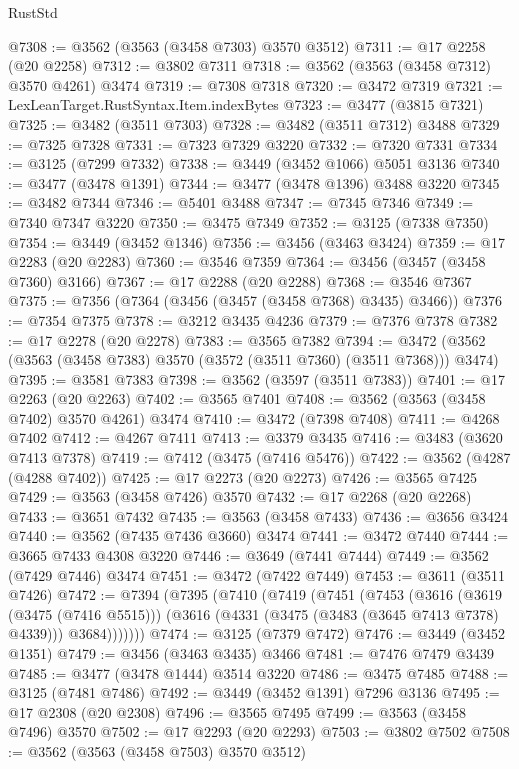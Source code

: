 \begin{lexlean}{RustStd}
\begin{coremodule}
{\begin{coremodule}
{{{{{{{{{{{{{{{{{{{{{{{{{{{{{{{{{{{{{{{{{{{{{@7308 := @3562 (@3563 (@3458 @7303) @3570 @3512)
@7311 := @17 @2258 (@20 @2258)
@7312 := @3802 @7311
@7318 := @3562 (@3563 (@3458 @7312) @3570 @4261) @3474
@7319 := @7308 @7318
@7320 := @3472 @7319
@7321 := LexLeanTarget.RustSyntax.Item.indexBytes
@7323 := @3477 (@3815 @7321)
@7325 := @3482 (@3511 @7303)
@7328 := @3482 (@3511 @7312) @3488
@7329 := @7325 @7328
@7331 := @7323 @7329 @3220
@7332 := @7320 @7331
@7334 := @3125 (@7299 @7332)
@7338 := @3449 (@3452 @1066) @5051 @3136
@7340 := @3477 (@3478 @1391)
@7344 := @3477 (@3478 @1396) @3488 @3220
@7345 := @3482 @7344
@7346 := @5401 @3488
@7347 := @7345 @7346
@7349 := @7340 @7347 @3220
@7350 := @3475 @7349
@7352 := @3125 (@7338 @7350)
@7354 := @3449 (@3452 @1346)
@7356 := @3456 (@3463 @3424)
@7359 := @17 @2283 (@20 @2283)
@7360 := @3546 @7359
@7364 := @3456 (@3457 (@3458 @7360) @3166)
@7367 := @17 @2288 (@20 @2288)
@7368 := @3546 @7367
@7375 := @7356 (@7364 (@3456 (@3457 (@3458 @7368) @3435) @3466))
@7376 := @7354 @7375
@7378 := @3212 @3435 @4236
@7379 := @7376 @7378
@7382 := @17 @2278 (@20 @2278)
@7383 := @3565 @7382
@7394 := @3472 (@3562 (@3563 (@3458 @7383) @3570 (@3572 (@3511 @7360) (@3511 @7368))) @3474)
@7395 := @3581 @7383
@7398 := @3562 (@3597 (@3511 @7383))
@7401 := @17 @2263 (@20 @2263)
@7402 := @3565 @7401
@7408 := @3562 (@3563 (@3458 @7402) @3570 @4261) @3474
@7410 := @3472 (@7398 @7408)
@7411 := @4268 @7402
@7412 := @4267 @7411
@7413 := @3379 @3435
@7416 := @3483 (@3620 @7413 @7378)
@7419 := @7412 (@3475 (@7416 @5476))
@7422 := @3562 (@4287 (@4288 @7402))
@7425 := @17 @2273 (@20 @2273)
@7426 := @3565 @7425
@7429 := @3563 (@3458 @7426) @3570
@7432 := @17 @2268 (@20 @2268)
@7433 := @3651 @7432
@7435 := @3563 (@3458 @7433)
@7436 := @3656 @3424
@7440 := @3562 (@7435 @7436 @3660) @3474
@7441 := @3472 @7440
@7444 := @3665 @7433 @4308 @3220
@7446 := @3649 (@7441 @7444)
@7449 := @3562 (@7429 @7446) @3474
@7451 := @3472 (@7422 @7449)
@7453 := @3611 (@3511 @7426)
@7472 := @7394
    (@7395
      (@7410
        (@7419
          (@7451
            (@7453
              (@3616
                (@3619 (@3475 (@7416 @5515)))
                (@3616 (@4331 (@3475 (@3483 (@3645 @7413 @7378) @4339))) @3684)))))))
@7474 := @3125 (@7379 @7472)
@7476 := @3449 (@3452 @1351)
@7479 := @3456 (@3463 @3435) @3466
@7481 := @7476 @7479 @3439
@7485 := @3477 (@3478 @1444) @3514 @3220
@7486 := @3475 @7485
@7488 := @3125 (@7481 @7486)
@7492 := @3449 (@3452 @1391) @7296 @3136
@7495 := @17 @2308 (@20 @2308)
@7496 := @3565 @7495
@7499 := @3563 (@3458 @7496) @3570
@7502 := @17 @2293 (@20 @2293)
@7503 := @3802 @7502
@7508 := @3562 (@3563 (@3458 @7503) @3570 @3512)
}}}}}}}}}}}}}}}}}}}}}}}}}}}}}}}}}}}}}}}}}}}}}
\end{coremodule}}
\end{coremodule}
\end{lexlean}
